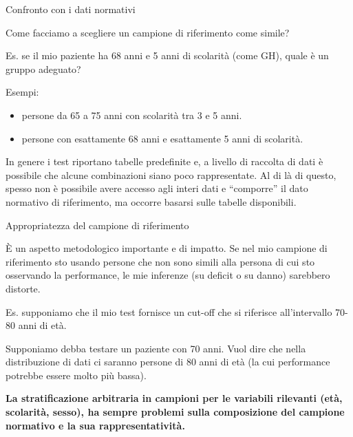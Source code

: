 \documentclass[
  ignorenonframetext,
  aspectratio=169,
]{beamer}
\providecommand{\tightlist}{%
  \setlength{\itemsep}{0pt}\setlength{\parskip}{0pt}}
\begin{document}
\begin{frame}{Confronto con i dati normativi}
\label{confronto-con-i-dati-normativi-2}
\small

Come facciamo a scegliere un campione di riferimento come simile?

Es. se il mio paziente ha 68 anni e 5 anni di scolarità (come GH), quale
è un gruppo adeguato?

Esempi:

\begin{itemize}
\tightlist
\item
  persone da 65 a 75 anni con scolarità tra 3 e 5 anni.
\item
  persone con esattamente 68 anni e esattamente 5 anni di scolarità.
\end{itemize}

In genere i test riportano tabelle predefinite e, a livello di raccolta
di dati è possibile che alcune combinazioni siano poco rappresentate. Al
di là di questo, spesso non è possibile avere accesso agli interi dati e
``comporre'' il dato normativo di riferimento, ma occorre basarsi sulle
tabelle disponibili.
\end{frame}

\begin{frame}{Appropriatezza del campione di riferimento}
\label{appropriatezza-del-campione-di-riferimento}
\small

È un aspetto metodologico importante e di impatto. Se nel mio campione
di riferimento sto usando persone che non sono simili alla persona di
cui sto osservando la performance, le mie inferenze (su deficit o su
danno) sarebbero distorte.

Es. supponiamo che il mio test fornisce un cut-off che si riferisce
all'intervallo 70-80 anni di età.

Supponiamo debba testare un paziente con 70 anni. Vuol dire che nella
distribuzione di dati ci saranno persone di 80 anni di età (la cui
performance potrebbe essere molto più bassa).

\textbf{La stratificazione arbitraria in campioni per le variabili
rilevanti (età, scolarità, sesso), ha sempre problemi sulla composizione
del campione normativo e la sua rappresentatività.}
\end{frame}
\end{document}
